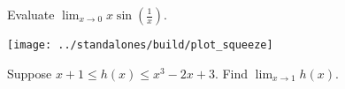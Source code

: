 \documentclass[../main.tex]{subfiles}
\begin{document}
  \begin{example}
    Evaluate \(\lim_{x \to 0} x \sin\left(\frac{1}{x}\right)\).

    \hfill\texttt{[image: ../standalones/build/plot\_squeeze]}
  \end{example}
  \clearpage

  \begin{example}
    Suppose \(x+1 \le h(x) \le x^{3} - 2x + 3\). Find \(\lim_{x \to 1} h(x)\).

  \end{example}
\end{document}
